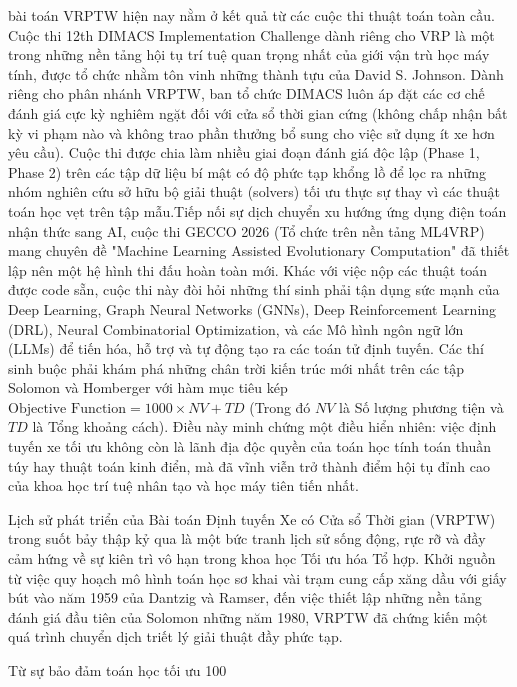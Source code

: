 \documentclass[13pt, a4paper]{extarticle} %
\begin{document}
bài toán VRPTW hiện nay nằm ở kết quả từ các cuộc thi thuật toán toàn cầu. Cuộc thi 12th DIMACS Implementation Challenge dành riêng cho VRP là một trong những nền tảng hội tụ trí tuệ quan trọng nhất của giới vận trù học máy tính, được tổ chức nhằm tôn vinh những thành tựu của David S. Johnson. Dành riêng cho phân nhánh VRPTW, ban tổ chức DIMACS luôn áp đặt các cơ chế đánh giá cực kỳ nghiêm ngặt đối với cửa sổ thời gian cứng (không chấp nhận bất kỳ vi phạm nào và không trao phần thưởng bổ sung cho việc sử dụng ít xe hơn yêu cầu). Cuộc thi được chia làm nhiều giai đoạn đánh giá độc lập (Phase 1, Phase 2) trên các tập dữ liệu bí mật có độ phức tạp khổng lồ để lọc ra những nhóm nghiên cứu sở hữu bộ giải thuật (solvers) tối ưu thực sự thay vì các thuật toán học vẹt trên tập mẫu.Tiếp nối sự dịch chuyển xu hướng ứng dụng điện toán nhận thức sang AI, cuộc thi GECCO 2026 (Tổ chức trên nền tảng ML4VRP) mang chuyên đề "Machine Learning Assisted Evolutionary Computation" đã thiết lập nên một hệ hình thi đấu hoàn toàn mới. Khác với việc nộp các thuật toán được code sẵn, cuộc thi này đòi hỏi những thí sinh phải tận dụng sức mạnh của Deep Learning, Graph Neural Networks (GNNs), Deep Reinforcement Learning (DRL), Neural Combinatorial Optimization, và các Mô hình ngôn ngữ lớn (LLMs) để tiến hóa, hỗ trợ và tự động tạo ra các toán tử định tuyến. Các thí sinh buộc phải khám phá những chân trời kiến trúc mới nhất trên các tập Solomon và Homberger với hàm mục tiêu kép $\text{Objective Function} = 1000 \times NV + TD$ (Trong đó $NV$ là Số lượng phương tiện và $TD$ là Tổng khoảng cách). Điều này minh chứng một điều hiển nhiên: việc định tuyến xe tối ưu không còn là lãnh địa độc quyền của toán học tính toán thuần túy hay thuật toán kinh điển, mà đã vĩnh viễn trở thành điểm hội tụ đỉnh cao của khoa học trí tuệ nhân tạo và học máy tiên tiến nhất.

Lịch sử phát triển của Bài toán Định tuyến Xe có Cửa sổ Thời gian (VRPTW) trong suốt bảy thập kỷ qua là một bức tranh lịch sử sống động, rực rỡ và đầy cảm hứng về sự kiên trì vô hạn trong khoa học Tối ưu hóa Tổ hợp. Khởi nguồn từ việc quy hoạch mô hình toán học sơ khai vài trạm cung cấp xăng dầu với giấy bút vào năm 1959 của Dantzig và Ramser, đến việc thiết lập những nền tảng đánh giá đầu tiên của Solomon những năm 1980, VRPTW đã chứng kiến một quá trình chuyển dịch triết lý giải thuật đầy phức tạp.

Từ sự bảo đảm toán học tối ưu 100%
\end{document}
